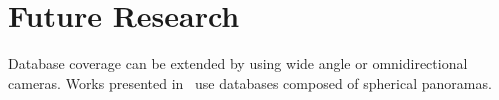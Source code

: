 \section{Future Research}



Database coverage can be extended by using wide angle or omnidirectional cameras. Works presented in~\citep{Arandjelovic2017,Iscen2017,Kumar2016mastersThesis,Ramalingam2010,Torii2011,Zamir2010,Zamir2014} use databases composed of spherical panoramas.